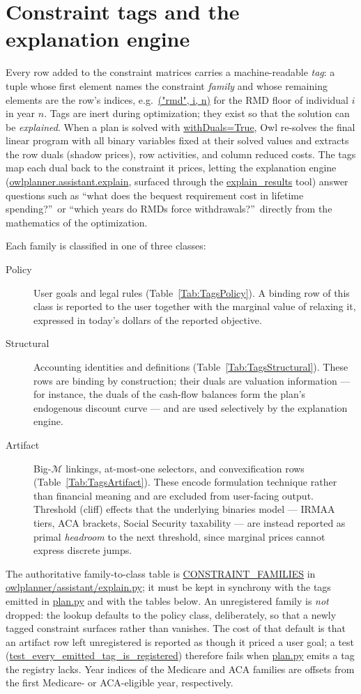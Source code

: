 \documentclass[fleqn,12pt]{report}
\newcommand{\code}[1]{\url{#1}}
\begin{document}
\section{Constraint tags and the explanation engine}
\label{Sec:ConstraintTags}
Every row added to the constraint matrices carries a machine-readable
\emph{tag}: a tuple whose first element names the constraint \emph{family} and
whose remaining elements are the row's indices, e.g.\ \code{("rmd", i, n)} for
the RMD floor of individual $i$ in year $n$.
Tags are inert during optimization; they exist so that the solution can be
\emph{explained}.
When a plan is solved with \code{withDuals=True}, Owl re-solves the final
linear program with all binary variables fixed at their solved values and
extracts the row duals (shadow prices), row activities, and column reduced
costs.
The tags map each dual back to the constraint it prices, letting the
explanation engine (\code{owlplanner.assistant.explain}, surfaced through the
\code{explain_results} tool) answer questions such as ``what does the bequest
requirement cost in lifetime spending?''\ or ``which years do RMDs force
withdrawals?''\ directly from the mathematics of the optimization.

Each family is classified in one of three classes:
\begin{description}
	\item[Policy] User goals and legal rules (Table~\ref{Tab:TagsPolicy}).
	A binding row of this class is reported to the user together with the
	marginal value of relaxing it, expressed in today's dollars of the
	reported objective.
	\item[Structural] Accounting identities and definitions
	(Table~\ref{Tab:TagsStructural}).
	These rows are binding by construction; their duals are valuation
	information --- for instance, the duals of the cash-flow balances form the
	plan's endogenous discount curve --- and are used selectively by the
	explanation engine.
	\item[Artifact] Big-$\mathcal{M}$ linkings, at-most-one selectors,
	and convexification rows
	(Table~\ref{Tab:TagsArtifact}).
	These encode formulation technique rather than financial meaning and are
	excluded from user-facing output.
	Threshold (cliff) effects that the underlying binaries model --- IRMAA
	tiers, ACA brackets, Social Security taxability --- are instead reported as
	primal \emph{headroom} to the next threshold, since marginal prices cannot
	express discrete jumps.
\end{description}
The authoritative family-to-class table is
\code{CONSTRAINT_FAMILIES} in \code{owlplanner/assistant/explain.py}; it must
be kept in synchrony with the tags emitted in \code{plan.py} and with the
tables below.
An unregistered family is \emph{not} dropped: the lookup defaults to the policy
class, deliberately, so that a newly tagged constraint surfaces rather than
vanishes.
The cost of that default is that an artifact row left unregistered is reported as
though it priced a user goal; a test (\code{test_every_emitted_tag_is_registered})
therefore fails when \code{plan.py} emits a tag the registry lacks.
Year indices of the Medicare and ACA families are offsets from the first
Medicare- or ACA-eligible year, respectively.
\end{document}
